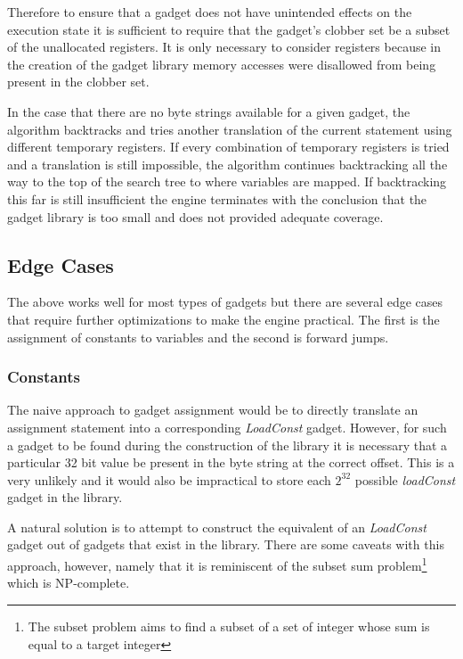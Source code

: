     Therefore to ensure that a gadget does not have unintended effects on the
    execution state it is sufficient to require that the gadget's clobber set be
    a subset of the unallocated registers. It is only necessary to consider
    registers because in the creation of the gadget library memory accesses were
    disallowed from being present in the clobber set.

    In the case that there are no byte strings available for a given gadget, the
    algorithm backtracks and tries another translation of the current statement
    using different temporary registers. If every combination of temporary
    registers is tried and a translation is still impossible, the algorithm
    continues backtracking all the way to the top of the search tree to where
    variables are mapped. If backtracking this far is still insufficient the
    engine terminates with the conclusion that the gadget library is too small
    and does not provided adequate coverage. 

    \subsection{Edge Cases}

    The above works well for most types of gadgets but there are several edge
    cases that require further optimizations to make the engine practical. The
    first is the assignment of constants to variables and the second is forward
    jumps.

    \subsubsection{Constants}

    The naive approach to gadget assignment would be to directly translate an
    assignment statement into a corresponding \emph{LoadConst} gadget. However,
    for such a gadget to be found during the construction of the library it is
    necessary that a particular 32 bit value be present in the byte string at
    the correct offset. This is a very unlikely and it would also be impractical
    to store each $2^{32}$ possible \emph{loadConst} gadget in the library. 

    A natural solution is to attempt to construct the equivalent of an
    \emph{LoadConst} gadget out of gadgets that exist in the library. There are
    some caveats with this approach, however, namely that it is reminiscent of
    the subset sum problem\footnote{The subset problem aims to find a subset of
    a set of integer whose sum is equal to a target integer} which is
    NP-complete.

